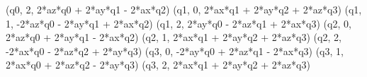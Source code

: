 \documentclass[]{article}
\newenvironment{Shaded}{}{}
\newcommand{\DecValTok}[1]{\textcolor[rgb]{0.25,0.63,0.44}{#1}}
\newcommand{\OperatorTok}[1]{\textcolor[rgb]{0.40,0.40,0.40}{#1}}
\newcommand{\NormalTok}[1]{#1}
\begin{document}
\begin{Shaded}
\begin{Highlighting}[]
\NormalTok{(q0, }\DecValTok{2}\NormalTok{, }\DecValTok{2}\OperatorTok{*}\NormalTok{az}\OperatorTok{*}\NormalTok{q0 }\OperatorTok{+} \DecValTok{2}\OperatorTok{*}\NormalTok{ay}\OperatorTok{*}\NormalTok{q1 }\OperatorTok{-} \DecValTok{2}\OperatorTok{*}\NormalTok{ax}\OperatorTok{*}\NormalTok{q2)}
\NormalTok{(q1, }\DecValTok{0}\NormalTok{, }\DecValTok{2}\OperatorTok{*}\NormalTok{ax}\OperatorTok{*}\NormalTok{q1 }\OperatorTok{+} \DecValTok{2}\OperatorTok{*}\NormalTok{ay}\OperatorTok{*}\NormalTok{q2 }\OperatorTok{+} \DecValTok{2}\OperatorTok{*}\NormalTok{az}\OperatorTok{*}\NormalTok{q3)}
\NormalTok{(q1, }\DecValTok{1}\NormalTok{, }\OperatorTok{-}\DecValTok{2}\OperatorTok{*}\NormalTok{az}\OperatorTok{*}\NormalTok{q0 }\OperatorTok{-} \DecValTok{2}\OperatorTok{*}\NormalTok{ay}\OperatorTok{*}\NormalTok{q1 }\OperatorTok{+} \DecValTok{2}\OperatorTok{*}\NormalTok{ax}\OperatorTok{*}\NormalTok{q2)}
\NormalTok{(q1, }\DecValTok{2}\NormalTok{, }\DecValTok{2}\OperatorTok{*}\NormalTok{ay}\OperatorTok{*}\NormalTok{q0 }\OperatorTok{-} \DecValTok{2}\OperatorTok{*}\NormalTok{az}\OperatorTok{*}\NormalTok{q1 }\OperatorTok{+} \DecValTok{2}\OperatorTok{*}\NormalTok{ax}\OperatorTok{*}\NormalTok{q3)}
\NormalTok{(q2, }\DecValTok{0}\NormalTok{, }\DecValTok{2}\OperatorTok{*}\NormalTok{az}\OperatorTok{*}\NormalTok{q0 }\OperatorTok{+} \DecValTok{2}\OperatorTok{*}\NormalTok{ay}\OperatorTok{*}\NormalTok{q1 }\OperatorTok{-} \DecValTok{2}\OperatorTok{*}\NormalTok{ax}\OperatorTok{*}\NormalTok{q2)}
\NormalTok{(q2, }\DecValTok{1}\NormalTok{, }\DecValTok{2}\OperatorTok{*}\NormalTok{ax}\OperatorTok{*}\NormalTok{q1 }\OperatorTok{+} \DecValTok{2}\OperatorTok{*}\NormalTok{ay}\OperatorTok{*}\NormalTok{q2 }\OperatorTok{+} \DecValTok{2}\OperatorTok{*}\NormalTok{az}\OperatorTok{*}\NormalTok{q3)}
\NormalTok{(q2, }\DecValTok{2}\NormalTok{, }\OperatorTok{-}\DecValTok{2}\OperatorTok{*}\NormalTok{ax}\OperatorTok{*}\NormalTok{q0 }\OperatorTok{-} \DecValTok{2}\OperatorTok{*}\NormalTok{az}\OperatorTok{*}\NormalTok{q2 }\OperatorTok{+} \DecValTok{2}\OperatorTok{*}\NormalTok{ay}\OperatorTok{*}\NormalTok{q3)}
\NormalTok{(q3, }\DecValTok{0}\NormalTok{, }\OperatorTok{-}\DecValTok{2}\OperatorTok{*}\NormalTok{ay}\OperatorTok{*}\NormalTok{q0 }\OperatorTok{+} \DecValTok{2}\OperatorTok{*}\NormalTok{az}\OperatorTok{*}\NormalTok{q1 }\OperatorTok{-} \DecValTok{2}\OperatorTok{*}\NormalTok{ax}\OperatorTok{*}\NormalTok{q3)}
\NormalTok{(q3, }\DecValTok{1}\NormalTok{, }\DecValTok{2}\OperatorTok{*}\NormalTok{ax}\OperatorTok{*}\NormalTok{q0 }\OperatorTok{+} \DecValTok{2}\OperatorTok{*}\NormalTok{az}\OperatorTok{*}\NormalTok{q2 }\OperatorTok{-} \DecValTok{2}\OperatorTok{*}\NormalTok{ay}\OperatorTok{*}\NormalTok{q3)}
\NormalTok{(q3, }\DecValTok{2}\NormalTok{, }\DecValTok{2}\OperatorTok{*}\NormalTok{ax}\OperatorTok{*}\NormalTok{q1 }\OperatorTok{+} \DecValTok{2}\OperatorTok{*}\NormalTok{ay}\OperatorTok{*}\NormalTok{q2 }\OperatorTok{+} \DecValTok{2}\OperatorTok{*}\NormalTok{az}\OperatorTok{*}\NormalTok{q3)}
\end{Highlighting}
\end{Shaded}
\end{document}
